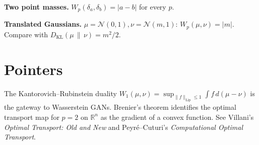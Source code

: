 \documentclass[11pt]{article}
\theoremstyle{definition}
\theoremstyle{remark}
\begin{document}
\textbf{Two point masses.}  $W_p(\delta_a, \delta_b) = |a - b|$ for every $p$.

\smallskip

\textbf{Translated Gaussians.}  $\mu = \mathcal{N}(0, 1), \nu = \mathcal{N}(m, 1)$:
$W_p(\mu, \nu) = |m|$.  Compare with $D_{\mathrm{KL}}(\mu \,\|\, \nu) = m^2/2$.

\section*{Pointers}

The Kantorovich--Rubinstein duality
$W_1(\mu, \nu) = \sup_{\|f\|_{\mathrm{Lip}} \leq 1} \int f \, d(\mu - \nu)$ is the
gateway to Wasserstein GANs.  Brenier's theorem identifies the optimal transport
map for $p = 2$ on $\mathbb{R}^n$ as the gradient of a convex function.  See Villani's
\emph{Optimal Transport: Old and New} and Peyr\'e--Cuturi's
\emph{Computational Optimal Transport}.
\end{document}
